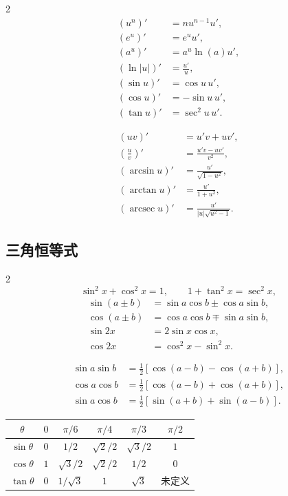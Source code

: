 \documentclass[UTF8,a4paper,10pt,fontset=fandol]{ctexart}
\begin{document}
\begin{multicols}{2}
\[
\begin{aligned}
(u^n)'&=nu^{n-1}u',\\
(e^u)'&=e^u u',\\
(a^u)'&=a^u\ln(a)u',\\
(\ln|u|)'&=\frac{u'}u,\\
(\sin u)'&=\cos u\,u',\\
(\cos u)'&=-\sin u\,u',\\
(\tan u)'&=\sec^2u\,u'.
\end{aligned}
\]

\columnbreak
\[
\begin{aligned}
(uv)'&=u'v+uv',\\
\left(\frac uv\right)'&=\frac{u'v-uv'}{v^2},\\
(\arcsin u)'&=\frac{u'}{\sqrt{1-u^2}},\\
(\arctan u)'&=\frac{u'}{1+u^2},\\
(\operatorname{arcsec}u)'&=\frac{u'}{|u|\sqrt{u^2-1}}.
\end{aligned}
\]
\end{multicols}

\subsection{三角恒等式}

\begin{multicols}{2}
\[
\sin^2x+\cos^2x=1,
\qquad
1+\tan^2x=\sec^2x,
\]
\[
\begin{aligned}
\sin(a\pm b)&=\sin a\cos b\pm\cos a\sin b,\\
\cos(a\pm b)&=\cos a\cos b\mp\sin a\sin b,\\
\sin2x&=2\sin x\cos x,\\
\cos2x&=\cos^2x-\sin^2x.
\end{aligned}
\]

\columnbreak
\[
\begin{aligned}
\sin a\sin b&=\tfrac12[\cos(a-b)-\cos(a+b)],\\
\cos a\cos b&=\tfrac12[\cos(a-b)+\cos(a+b)],\\
\sin a\cos b&=\tfrac12[\sin(a+b)+\sin(a-b)].
\end{aligned}
\]
\end{multicols}

\begin{center}
\begin{tabular}{c|ccccc}
\toprule
$\theta$ & $0$ & $\pi/6$ & $\pi/4$ & $\pi/3$ & $\pi/2$ \\
\midrule
$\sin\theta$ & $0$ & $1/2$ & $\sqrt2/2$ & $\sqrt3/2$ & $1$ \\
$\cos\theta$ & $1$ & $\sqrt3/2$ & $\sqrt2/2$ & $1/2$ & $0$ \\
$\tan\theta$ & $0$ & $1/\sqrt3$ & $1$ & $\sqrt3$ & 未定义 \\
\bottomrule
\end{tabular}
\end{center}
\end{document}
